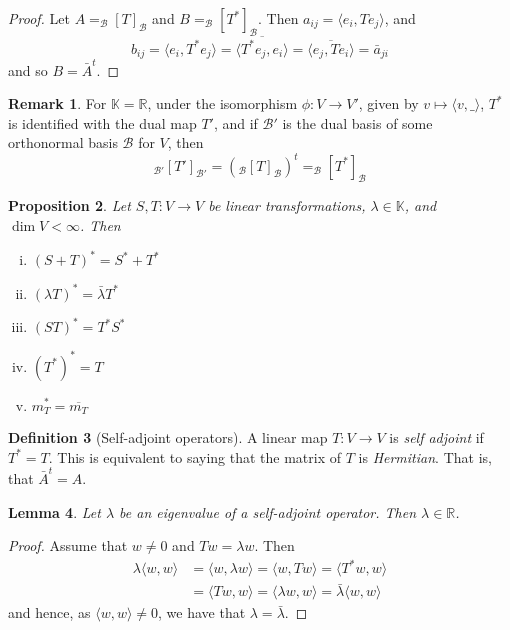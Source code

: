 \documentclass[10pt,fleqn]{article}
\newcommand{\reals}{\mathbb{R}}
\newcommand{\basis}{\mathcal{B}}
\theoremstyle{definition} \newtheorem{defn}{Definition}[section]
\theoremstyle{plain}      \newtheorem{thm}[defn]{Theorem}
\theoremstyle{plain}      \newtheorem{prop}[defn]{Proposition}
\theoremstyle{plain}      \newtheorem{lem}[defn]{Lemma}
\theoremstyle{plain}      \newtheorem{cor}[defn]{Corollary}
\theoremstyle{plain}      \newtheorem{ad}[defn]{Addendum}
\theoremstyle{definition} \newtheorem{ex}[defn]{Example}
\theoremstyle{definition} \newtheorem{rem}[defn]{Remark}
\numberwithin{equation}{subsection}
\begin{document}
\begin{proof}
    Let $A=_{\basis}[T]_{\basis}$ and $B=_{\basis}[T^*]_{\basis}$.
    Then $a_{ij}=\langle e_i,Te_j\rangle$, and
    \[
        b_{ij}=
        \langle e_i,T^*e_j\rangle=
        \overline{\langle T^*e_j,e_i\rangle}=
        \overline{\langle e_j,Te_i\rangle}=
        \bar{a}_{ji}
    \]
    and so $B=\bar{A}^t$.
\end{proof}

\begin{rem}
    For $\mathbb{K}=\reals$, under the isomorphism $\phi:V\to V'$, given by $v\mapsto\langle v,\_\rangle$, $T^*$ is identified with the dual map $T'$, and if $\basis'$ is the dual basis of some orthonormal basis $\basis$ for $V$, then
    \[
        _{\basis'}[T']_{\basis'}=
        (_{\basis}[T]_{\basis})^t=
        _{\basis}[T^*]_{\basis}
    \]
\end{rem}

\begin{prop}
    Let $S,T:V\to V$ be linear transformations, $\lambda\in\mathbb{K}$, and $\dim V<\infty$.
    Then
    \begin{enumerate}[(i)]
        \item $(S+T)^*=S^*+T^*$
        \item $(\lambda T)^*=\bar{\lambda}T^*$
        \item $(ST)^*=T^*S^*$
        \item $(T^*)^*=T$
        \item $m_T^*=\overline{m_T}$
    \end{enumerate}
\end{prop}

\begin{defn}[Self-adjoint operators]
    A linear map $T:V\to V$ is \emph{self adjoint} if $T^*=T$.
    This is equivalent to saying that the matrix of $T$ is \emph{Hermitian}.
    That is, that $\bar{A}^t=A$.
\end{defn}

\begin{lem}\label{real-eigen}
    Let $\lambda$ be an eigenvalue of a self-adjoint operator.
    Then $\lambda\in\reals$.
\end{lem}

\begin{proof}
    Assume that $w\neq0$ and $Tw=\lambda w$.
    Then
    \begin{align*}
        \lambda\langle w,w\rangle
        &=
        \langle w,\lambda w\rangle
        =
        \langle w,Tw\rangle
        =
        \langle T^*w,w\rangle\\
        &=
        \langle Tw,w\rangle
        =
        \langle \lambda w,w\rangle
        =
        \bar{\lambda}\langle w,w\rangle
    \end{align*}
    and hence, as $\langle w,w\rangle\neq0$, we have that $\lambda=\bar{\lambda}$.
\end{proof}
\end{document}
